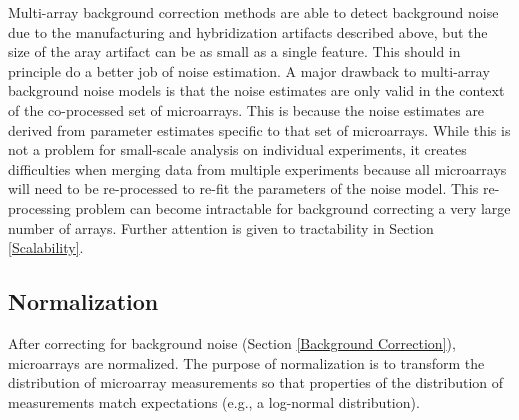 %
%

Multi-array background correction methods are able to detect background noise
due to the manufacturing and hybridization artifacts described above, but the
size of the aray artifact can be as small as a single feature.  This should in
principle do a better job of noise estimation.  A major drawback to multi-array
background noise models is that the noise estimates are only valid in the
context of the co-processed set of microarrays.  This is because the noise
estimates are derived from parameter estimates specific to that set of
microarrays.  While this is not a problem for small-scale analysis on
individual experiments, it creates difficulties when merging data from multiple
experiments because all microarrays will need to be re-processed to re-fit the
parameters of the noise model.  This re-processing problem can become
intractable for background correcting a very large number of arrays.  Further
attention is given to tractability in Section \ref{Scalability}.

\subsection{Normalization}\label{Normalization}

After correcting for background noise (Section \ref{Background Correction}),
microarrays are normalized.  The purpose of normalization is to transform the
distribution of microarray measurements so that properties of the distribution
of measurements match expectations (e.g., a log-normal distribution).

